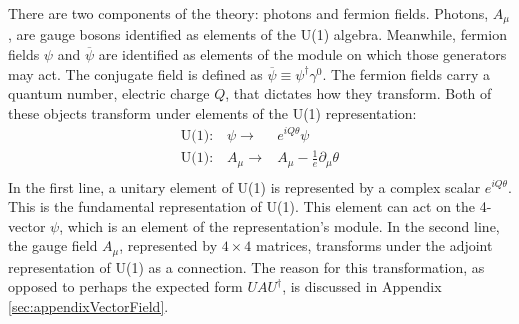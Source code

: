 There are two components of the theory: photons and fermion fields.
Photons, $A_\mu$, are gauge bosons identified as elements of the U(1) algebra.
Meanwhile, fermion fields $\psi$ and $\overline{\psi}$ are identified as elements of the module on which those generators may act.
The conjugate field is defined as $\overline{\psi}\equiv\psi^\dagger\gamma^0$.
The fermion fields carry a quantum number, electric charge $Q$, that dictates how they transform.
Both of these objects transform under elements of the U(1) representation:
\begin{equation}\begin{split}\label{eqn:u1Transform}
    \text{U(1):}\quad \psi\to& e^{iQ\theta}\psi \\
    \text{U(1):}\quad A_\mu\to& A_\mu-\frac{1}{e}\partial_\mu\theta \\
\end{split}\end{equation}
In the first line, a unitary element of U(1) is represented by a complex scalar $e^{iQ\theta}$.
This is the fundamental representation of U(1). \check
This element can act on the 4-vector $\psi$, which is an element of the representation's module.
In the second line, the gauge field $A_\mu$, represented by $4\times4$ matrices, transforms under the adjoint representation of U(1) as a connection.
The reason for this transformation, as opposed to perhaps the expected form $UAU^\dagger$, is discussed in Appendix \ref{sec:appendixVectorField}.

